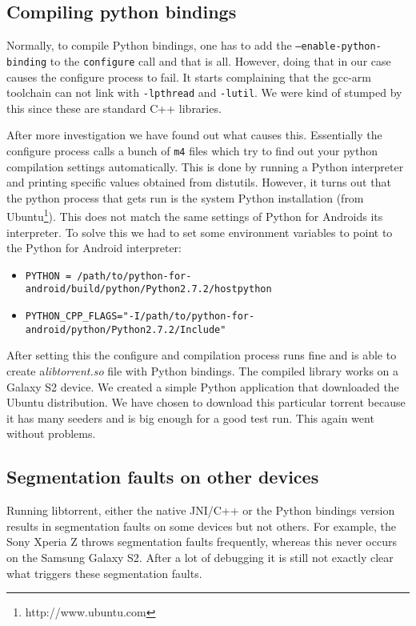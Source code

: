 		\subsection{Compiling python bindings}
			Normally, to compile Python bindings, one has to add the \texttt{--enable-python-binding} to the \texttt{configure} call and that is all. However, doing that in our case causes the configure process to fail. It starts complaining that the gcc-arm toolchain can not link with \texttt{-lpthread} and \texttt{-lutil}. We were kind of stumped by this since these are standard C++ libraries.
			
			After more investigation we have found out what causes this. Essentially the configure process calls a bunch of \texttt{m4} files which try to find out your python compilation settings automatically. This is done by running a Python interpreter and printing specific values obtained from distutils. However, it turns out that the python process that gets run is the system Python installation (from Ubuntu\footnote{http://www.ubuntu.com}). This does not match the same settings of Python for Androids its interpreter. To solve this we had to set some environment variables to point to the Python for Android interpreter:
			
			\begin{itemize}
				\item \texttt{PYTHON = /path/to/python-for-android/build/python/Python2.7.2/hostpython}
				\item \texttt{PYTHON\_CPP\_FLAGS="-I/path/to/python-for-android/python/Python2.7.2/Include"}
			\end{itemize}
			
			After setting this the configure and compilation process runs fine and is able to create a\emph{libtorrent.so} file with Python bindings. The compiled library works on a Galaxy S2 device. We created a simple Python application that downloaded the Ubuntu distribution. We have chosen to download this particular torrent because it has many seeders and is big enough for a good test run. This again went without problems.
			
		\subsection{Segmentation faults on other devices}
			Running libtorrent, either the native JNI/C++ or the Python bindings version results in segmentation faults on some devices but not others. For example, the Sony Xperia Z throws segmentation faults frequently, whereas this never occurs on the Samsung Galaxy S2.  After a lot of debugging it is still not exactly clear what triggers these segmentation faults.
			
